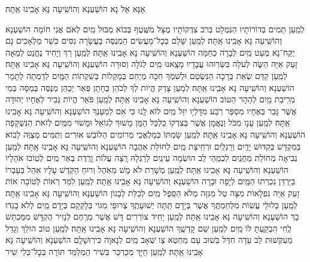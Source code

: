 \documentclass[twoside, openany, parskip=half, 11pt]{book}
\begin{document}
\begin{large}
\shatzvkahal
אָנָּא אֵל נָא הוֹשַׁעְנָא וְהוֹשִֽׁיעָה נָּא אָבִֽינוּ אַֽתָּה׃

\end{large}

\begin{small}
לְמַֽעַן תָּמִים בְּדוֹרוֹתָיו הַנִּמְלָט בְּרֹב צִדְקוֹתָיו
מֻצָּל מִשֶּֽׁטֶף בְּבוֹא מַבּוּל מַֽיִם לְאֹם אֲנִי חוֹמָה הוֹשַׁעְנָא וְהוֹשִֽׁיעָה נָּא אָבִֽינוּ אַֽתָּה׃
לְמַֽעַן שָׁלֵם בְּכׇל־מַעֲשִׂים הַמְנֻסֶּה בַּעֲשָׂרָה נִסִּים
כְּשָׁר מַלְאָכִים נָם יֻקַּח־נָא מְעַט מַֽיִם לְבָרָה כַּחַמָּה הוֹשַׁעְנָא וְהוֹשִֽׁיעָה נָּא אָבִֽינוּ אַֽתָּה׃
לְמַֽעַן רַךְ וְיָחִיד נֶחֱנַט לְמֵאָה זָעַק אַיֵּה הַשֶּׂה לְעֹלָה
בִּשְּׂרֽוּהוּ עֲבָדָיו מָצָֽאנוּ מַֽיִם לְגֹלָה וְסוּרָה הוֹשַׁעְנָא וְהוֹשִֽׁיעָה נָּא אָבִֽינוּ אַֽתָּה׃
לְמַֽעַן קִדַּם שְׂאֵת בְּרָכָה הַנִּשְׂטַם וּלְשִׁמְךָ חִכָּה
מְיַחֵם בְּמַקְלוֹת בְּשִׁקְתוֹת הַמַּֽיִם לְדָמְתָה לְתָמָר הוֹשַׁעְנָא וְהוֹשִֽׁיעָה נָּא אָבִֽינוּ אַֽתָּה׃
לְמַעַן צָדַק הֱיוֹת לְךָ לְכֹהֵן כֶּחָתָן פְּאֵר יְכַהֵן
מְנֻסֶּה בְּמַסָּה בְּמֵי מְרִֽיבַת מַֽיִם לְהָהָר הַטּוֹב הוֹשַׁעְנָא וְהוֹשִֽׁיעָה נָּא אָבִֽינוּ אַֽתָּה׃
לְמַֽעַן פֹּאַר הֱיוֹת גְּבִיר לְאֶחָיו יְהוּדָה אֲשֶׁר גָּבַר בְּאֶחָיו
מִסְפַּר רֹֽבַע מִדָּלְיָו יִזַּל מַֽיִם לוֹא לָֽנוּ כִּי אִם לְמַעַנְךָ הוֹשַׁעְנָא וְהוֹשִֽׁיעָה נָּא אָבִֽינוּ אַֽתָּה׃
לְמַֽעַן עָנָו מִכֹּל וְנֶאֱמָן אֲשֶׁר בְּצִדְקוֹ כִּלְכֵּל הַמָּן
מָשׁוּךְ לְגוֹאֵל וּמָשׁוּי מִמַּֽיִם לְזֹאת הַנִּשְׁקָפָה הוֹשַׁעְנָא וְהוֹשִֽׁיעָה נָּא אָבִֽינוּ אַֽתָּה׃
לְמַֽעַן שַׂמְתּוֹ כְּמַלְאֲכֵי מְרוֹמִים הַלּוֹבֵשׁ אוּרִים וְתֻמִּים
מְצֻוֶּה לָבוֹא בַּמִּקְדָּשׁ בְּקִדּוּשׁ יָדַֽיִם וְרַגְלַֽיִם וּרְחִֽיצַת מַֽיִם
לְחוֹלַת אַהֲבָה הוֹשַׁעְנָא וְהוֹשִֽׁיעָה נָּא אָבִֽינוּ אַֽתָּה׃
לְמַֽעַן נְבִיאָה מְחוֹלַת מַחֲנַֽיִם לִכְמֵֽהֵי לֵב הוּשְׂמָה עֵינַֽיִם
לְרַגְלָהּ רָֽצָה עֲלוֹת וָרֶֽדֶת בְּאֵר מַֽיִם לְטֽוֹבוּ אֹהָלָיו הוֹשַׁעְנָא וְהוֹשִֽׁיעָה נָּא אָבִֽינוּ אַֽתָּה׃
לְמַֽעַן מְשָׁרֵת לֹא מָשׁ מֵאֹֽהֶל וְרוּחַ הַקֹּֽדֶשׁ עָלָיו אִהֵל
בְּעָבְרוֹ בַיַּרְדֵּן נִכְרְתוּ הַמַּֽיִם לְיָפָה וּבָרָה הוֹשַׁעְנָא וְהוֹשִֽׁיעָה נָּא אָבִֽינוּ אַֽתָּה׃
לְמַֽעַן לִמַּד רְאוֹת לְטוֹבָה אוֹת זָעַק אַיֵּה נִפְלָאוֹת
מִצָּה טַל מִגִּזָּה מְלֹא הַסֵּֽפֶל מַֽיִם לְכַלַּת לְבָנוֹן הוֹשַׁעְנָא וְהוֹשִֽׁיעָה נָּא אָבִֽינוּ אַֽתָּה׃
לְמַֽעַן כְּלוּלֵי עֲשׂוֹת מִלְחַמְתֶּֽךָ אֲשֶׁר בְּיָדָם תַּֽתָּה יְשׁוּעָתֶֽךָ
צְרוּפֵי מִגּוֹי בְּלָקְקָם בְּיָדָם מַֽיִם לְלֹא בָגְדוּ בָךְ הוֹשַׁעְנָא וְהוֹשִֽׁיעָה נָּא אָבִֽינוּ אַֽתָּה׃
לְמַֽעַן יָחִיד צוֹרְרִים דָּשׁ אֲשֶׁר מֵרֶֽחֶם לְנָזִיר הֻקְדָּשׁ
מִמַּכְתֵּשׁ לֶֽחִי הִבְקַֽעְתָּ לּוֹ מַֽיִם לְמַֽעַן שֵׁם קׇדְשֶֽׁךָ הוֹשַׁעְנָא וְהוֹשִֽׁיעָה נָּא אָבִֽינוּ אַֽתָּה׃
לְמַֽעַן טוֹב הוֹלֵךְ וְגָדֵל מֵעִקְּשׁוּת לֵב עֵדָה חִדֵּל
בְּשׁוּב עָם מֵחֵטְא צָו שְׁאָב מַֽיִם לְנָאוָה כִּירֽוּשָׁלָֽםִ הוֹשַׁעְנָא וְהוֹשִֽׁיעָה נָּא אָבִֽינוּ אַֽתָּה׃
לְמַֽעַן חַיָּךְ מְכַרְכֵּר בְּשִׁיר הַמְלַמֵּד תּוֹרָה בְּכׇל־כְּלֵי שִׁיר

\end{small}
\end{document}
